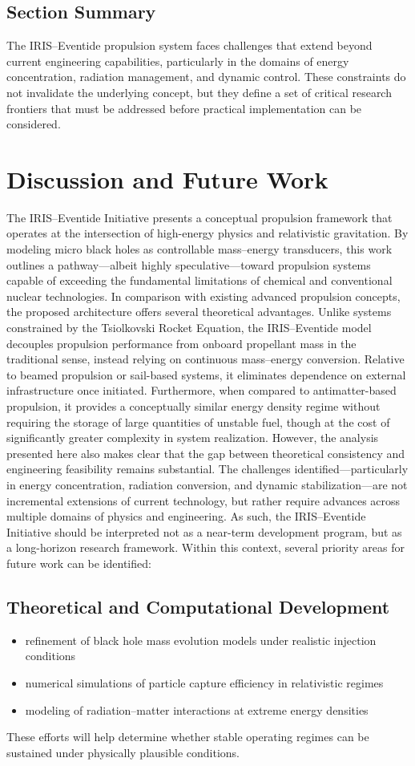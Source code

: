 \documentclass[conference]{IEEEtran}
\begin{document}
\subsection{Section Summary}
The IRIS–Eventide propulsion system faces challenges that extend beyond current engineering capabilities, particularly in the domains of energy concentration, radiation management, and dynamic control. These constraints do not invalidate the underlying concept, but they define a set of critical research frontiers that must be addressed before practical implementation can be considered.
\section{Discussion and Future Work}
The IRIS–Eventide Initiative presents a conceptual propulsion framework that operates at the intersection of high-energy physics and relativistic gravitation. By modeling micro black holes as controllable mass–energy transducers, this work outlines a pathway—albeit highly speculative—toward propulsion systems capable of exceeding the fundamental limitations of chemical and conventional nuclear technologies.
In comparison with existing advanced propulsion concepts, the proposed architecture offers several theoretical advantages. Unlike systems constrained by the Tsiolkovski Rocket Equation, the IRIS–Eventide model decouples propulsion performance from onboard propellant mass in the traditional sense, instead relying on continuous mass–energy conversion. Relative to beamed propulsion or sail-based systems, it eliminates dependence on external infrastructure once initiated. Furthermore, when compared to antimatter-based propulsion, it provides a conceptually similar energy density regime without requiring the storage of large quantities of unstable fuel, though at the cost of significantly greater complexity in system realization.
However, the analysis presented here also makes clear that the gap between theoretical consistency and engineering feasibility remains substantial. The challenges identified—particularly in energy concentration, radiation conversion, and dynamic stabilization—are not incremental extensions of current technology, but rather require advances across multiple domains of physics and engineering.
As such, the IRIS–Eventide Initiative should be interpreted not as a near-term development program, but as a long-horizon research framework. Within this context, several priority areas for future work can be identified:
\subsection{Theoretical and Computational Development}
\begin{itemize}
\item refinement of black hole mass evolution models under realistic injection conditions
\item numerical simulations of particle capture efficiency in relativistic regimes
\item modeling of radiation–matter interactions at extreme energy densities
\end{itemize}
These efforts will help determine whether stable operating regimes can be sustained under physically plausible conditions.
\end{document}
